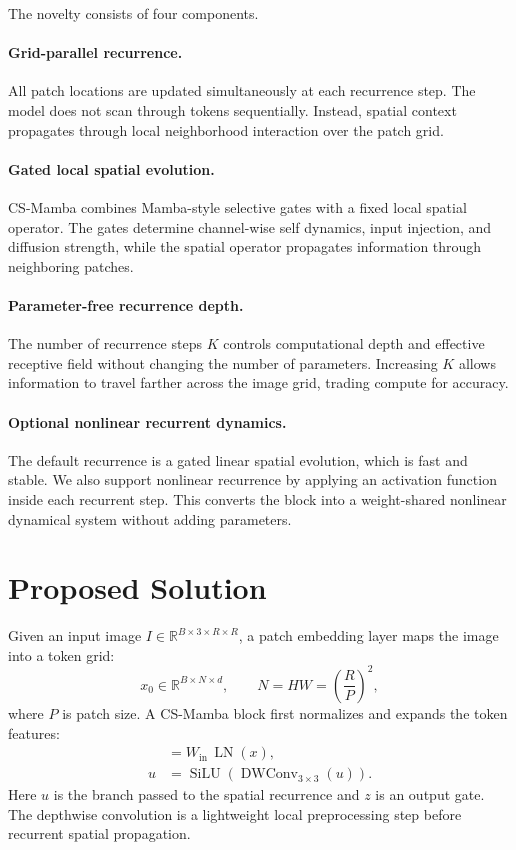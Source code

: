 \documentclass[11pt]{article}
\newcommand{\csm}{CS-Mamba}
\newcommand{\R}{\mathbb{R}}
\newcommand{\silu}{\operatorname{SiLU}}
\begin{document}
The novelty consists of four components.

\paragraph{Grid-parallel recurrence.}
All patch locations are updated simultaneously at each recurrence step. The model
does not scan through tokens sequentially. Instead, spatial context propagates
through local neighborhood interaction over the patch grid.

\paragraph{Gated local spatial evolution.}
\csm{} combines Mamba-style selective gates with a fixed local spatial operator.
The gates determine channel-wise self dynamics, input injection, and diffusion
strength, while the spatial operator propagates information through neighboring
patches.

\paragraph{Parameter-free recurrence depth.}
The number of recurrence steps $K$ controls computational depth and effective
receptive field without changing the number of parameters. Increasing $K$ allows
information to travel farther across the image grid, trading compute for accuracy.

\paragraph{Optional nonlinear recurrent dynamics.}
The default recurrence is a gated linear spatial evolution, which is fast and
stable. We also support nonlinear recurrence by applying an activation function
inside each recurrent step. This converts the block into a weight-shared nonlinear
dynamical system without adding parameters.

\section{Proposed Solution}

Given an input image $I \in \R^{B \times 3 \times R \times R}$, a patch embedding
layer maps the image into a token grid:
\[
    x_0 \in \R^{B \times N \times d},
    \qquad
    N = H W = \left(\frac{R}{P}\right)^2,
\]
where $P$ is patch size. A \csm{} block first normalizes and expands the token
features:
\begin{align}
    [u,z] &= W_{\mathrm{in}}\,\operatorname{LN}(x), \\
    u    &= \silu\!\left(\operatorname{DWConv}_{3\times 3}(u)\right).
\end{align}
Here $u$ is the branch passed to the spatial recurrence and $z$ is an output gate.
The depthwise convolution is a lightweight local preprocessing step before recurrent
spatial propagation.
\end{document}
